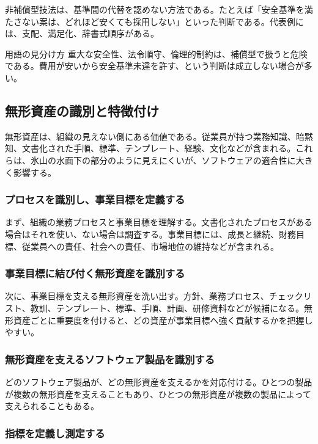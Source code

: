 \documentclass[a4paper,11pt]{ltjsarticle}
\numberwithin{figure}{section}
\numberwithin{table}{section}
\begin{document}
非補償型技法は、基準間の代替を認めない方法である。たとえば「安全基準を満たさない案は、どれほど安くても採用しない」といった判断である。代表例には、支配、満足化、辞書式順序がある。

\begin{notebox}{用語の見分け方}
重大な安全性、法令順守、倫理的制約は、補償型で扱うと危険である。費用が安いから安全基準未達を許す、という判断は成立しない場合が多い。
\end{notebox}

\subsection{無形資産の識別と特徴付け}

無形資産は、組織の見えない側にある価値である。従業員が持つ業務知識、暗黙知、文書化された手順、標準、テンプレート、経験、文化などが含まれる。これらは、氷山の水面下の部分のように見えにくいが、ソフトウェアの適合性に大きく影響する。

\subsubsection{プロセスを識別し、事業目標を定義する}

まず、組織の業務プロセスと事業目標を理解する。文書化されたプロセスがある場合はそれを使い、ない場合は調査する。事業目標には、成長と継続、財務目標、従業員への責任、社会への責任、市場地位の維持などが含まれる。

\subsubsection{事業目標に結び付く無形資産を識別する}

次に、事業目標を支える無形資産を洗い出す。方針、業務プロセス、チェックリスト、教訓、テンプレート、標準、手順、計画、研修資料などが候補になる。無形資産ごとに重要度を付けると、どの資産が事業目標へ強く貢献するかを把握しやすい。

\subsubsection{無形資産を支えるソフトウェア製品を識別する}

どのソフトウェア製品が、どの無形資産を支えるかを対応付ける。ひとつの製品が複数の無形資産を支えることもあり、ひとつの無形資産が複数の製品によって支えられることもある。

\subsubsection{指標を定義し測定する}
\end{document}
